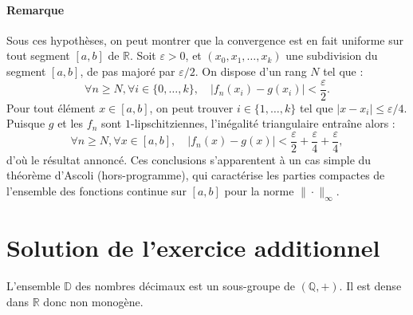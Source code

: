 \paragraph{Remarque} Sous ces hypothèses, on peut montrer que la convergence est en fait uniforme sur tout segment $[a,b]$ de $\mathbb R$. Soit $\varepsilon > 0$, et $(x_0,x_1,\dots,x_k)$ une subdivision du segment $[a,b]$, de pas majoré par $\varepsilon/2$. On dispose d'un rang $N$ tel que :
\[
\forall n\geqslant N,\forall i \in \{0,\dots,k\},\quad |f_n(x_i) - g(x_i)| < \frac{\varepsilon}2.
\]
Pour tout élément $x \in [a,b]$, on peut trouver $i \in \{1,\dots,k\}$ tel que $|x-x_i|\leqslant \varepsilon/4$. Puisque $g$ et les $f_n$ sont $1$-lipschitziennes, l'inégalité triangulaire entraîne alors :
\[
\forall n \geqslant N,\forall x \in [a,b],\quad |f_n(x) - g(x)| < \frac{\varepsilon}2 + \frac{\varepsilon}4 + \frac{\varepsilon}4,
\]
d'où le résultat annoncé.
Ces conclusions s'apparentent à un cas simple du théorème d'Ascoli (hors-programme), qui caractérise les parties compactes de l'ensemble des fonctions continue sur $[a,b]$ pour la norme $\|\cdot\|_\infty$.

\section{Solution de l'exercice additionnel}

L'ensemble $\mathbb D$ des nombres décimaux est un sous-groupe de $(\mathbb Q,+)$. Il est dense dans $\mathbb R$ donc non monogène. 